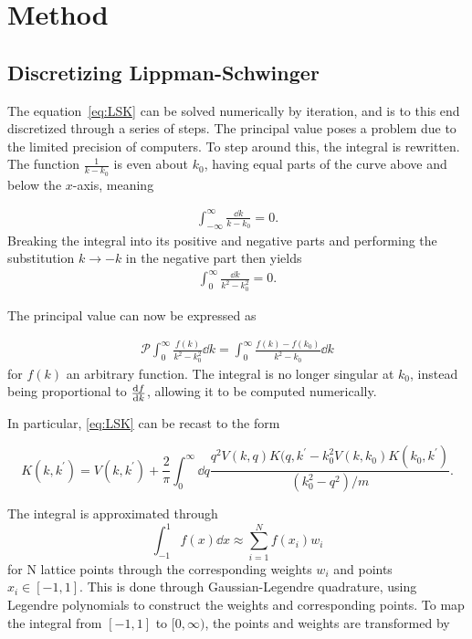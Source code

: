 \section{Method}\label{sec:Method}

\subsection{Discretizing Lippman-Schwinger}
\label{sec:discret}

The equation~\eqref{eq:LSK} can be solved numerically by iteration, and is to this end
discretized through a series of steps. The principal value poses a problem due
to the limited precision of computers.
To step around this, the integral is rewritten. The function
\(\frac{1}{k-k_{0}}\) is even about \(k_{0}\), having equal parts of the curve
above and below the \(x\)-axis, meaning

\begin{align*}
  \int_{-\infty}^{\infty}\frac{\dd k}{k-k_{0}} = 0.
\end{align*}
Breaking the integral into its positive and negative parts and performing the
substitution \(k\to -k\) in the negative part then yields
\begin{align*}
  \int_{0}^{\infty}\frac{\dd k}{k^{2}-k_{0}^{2}} = 0.
\end{align*}

The principal value can now be expressed as

\begin{align*}
  \mathcal{P}\int_{0}^{\infty}\frac{f(k)}{k^{2}-k_{0}^{2}} \dd k = \int_{0}^{\infty}\frac{f(k)-f(k_{0})}{k^{2}-k_{0}}\dd k
\end{align*}
for \(f(k)\) an arbitrary function.
The integral is no longer singular at \(k_{0}\), instead being proportional to
\(\dv{f}{k}\), allowing it to be computed numerically.

In particular, \eqref{eq:LSK} can be recast to the form

\begin{equation}
  \label{eq:LSKK}
  K(k, k^{\prime}) = V(k, k^{\prime}) + \frac{2}{\pi}\int_{0}^{\infty}
  \dd q \frac{q^{2}V(k,q)K(q,k^{\prime} - k^{2}_{0}V(k, k_{0})K(k_{0},k^{\prime})}{(k_{0}^{2}-q^{2})/m}.
\end{equation}

The integral is approximated through
\begin{equation*}
  \int_{-1}^{1}f(x)\dd x \approx \sum_{i=1}^{N}f(x_{i})w_{i}
\end{equation*}
for N lattice points through the corresponding weights \(w_{i}\) and points
\(x_{i}\in [-1, 1]\). This is done through Gaussian-Legendre quadrature, using
Legendre polynomials to construct the weights and corresponding points. To map
the integral from \([-1, 1]\) to \([0, \infty)\), the points and weights are
transformed by


